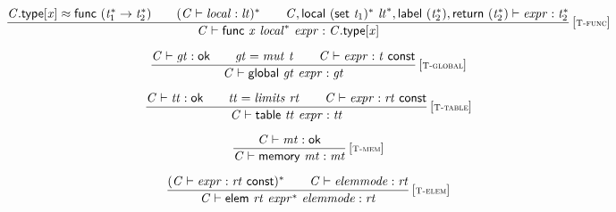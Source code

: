 $$
\begin{array}{@{}c@{}}\displaystyle
\frac{
{\mathit{C}}.\mathsf{type}{}[{\mathit{x}}] \approx \mathsf{func}~({{\mathit{t}}_{{1}}^\ast} \rightarrow {{\mathit{t}}_{{2}}^\ast})
 \qquad
({\mathit{C}} \vdash {\mathit{local}} : {\mathit{lt}})^\ast
 \qquad
{\mathit{C}}, \mathsf{local}~{(\mathsf{set}~{\mathit{t}}_{{1}})^\ast}~{{\mathit{lt}}^\ast}, \mathsf{label}~({{\mathit{t}}_{{2}}^\ast}), \mathsf{return}~({{\mathit{t}}_{{2}}^\ast}) \vdash {\mathit{expr}} : {{\mathit{t}}_{{2}}^\ast}
}{
{\mathit{C}} \vdash \mathsf{func}~{\mathit{x}}~{{\mathit{local}}^\ast}~{\mathit{expr}} : {\mathit{C}}.\mathsf{type}{}[{\mathit{x}}]
} \, {[\textsc{\scriptsize T{-}func}]}
\qquad
\end{array}
$$

$$
\begin{array}{@{}c@{}}\displaystyle
\frac{
{\mathit{C}} \vdash {\mathit{gt}} : \mathsf{ok}
 \qquad
{\mathit{gt}} = {\mathit{mut}}~{\mathit{t}}
 \qquad
{\mathit{C}} \vdash {\mathit{expr}} : {\mathit{t}}~\mathsf{const}
}{
{\mathit{C}} \vdash \mathsf{global}~{\mathit{gt}}~{\mathit{expr}} : {\mathit{gt}}
} \, {[\textsc{\scriptsize T{-}global}]}
\qquad
\end{array}
$$

$$
\begin{array}{@{}c@{}}\displaystyle
\frac{
{\mathit{C}} \vdash {\mathit{tt}} : \mathsf{ok}
 \qquad
{\mathit{tt}} = {\mathit{limits}}~{\mathit{rt}}
 \qquad
{\mathit{C}} \vdash {\mathit{expr}} : {\mathit{rt}}~\mathsf{const}
}{
{\mathit{C}} \vdash \mathsf{table}~{\mathit{tt}}~{\mathit{expr}} : {\mathit{tt}}
} \, {[\textsc{\scriptsize T{-}table}]}
\qquad
\end{array}
$$

$$
\begin{array}{@{}c@{}}\displaystyle
\frac{
{\mathit{C}} \vdash {\mathit{mt}} : \mathsf{ok}
}{
{\mathit{C}} \vdash \mathsf{memory}~{\mathit{mt}} : {\mathit{mt}}
} \, {[\textsc{\scriptsize T{-}mem}]}
\qquad
\end{array}
$$

$$
\begin{array}{@{}c@{}}\displaystyle
\frac{
({\mathit{C}} \vdash {\mathit{expr}} : {\mathit{rt}}~\mathsf{const})^\ast
 \qquad
{\mathit{C}} \vdash {\mathit{elemmode}} : {\mathit{rt}}
}{
{\mathit{C}} \vdash \mathsf{elem}~{\mathit{rt}}~{{\mathit{expr}}^\ast}~{\mathit{elemmode}} : {\mathit{rt}}
} \, {[\textsc{\scriptsize T{-}elem}]}
\qquad
\end{array}
$$

